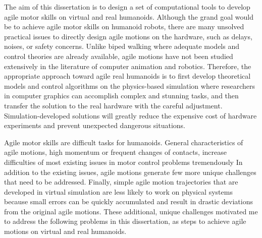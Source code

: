 The aim of this dissertation is to design a set of computational tools to
develop agile motor skills on virtual and real humanoids.
Although the grand goal would be to achieve agile motor skills on humanoid
robots,  there are many unsolved practical issues to directly
design agile 
motions on the hardware, such as delays, noises, or safety concerns.
Unlike biped walking where adequate models and control theories are
already available, agile motions have not been studied extensively in the
literature of computer animation and robotics.
Therefore, the appropriate approach toward agile real humanoids is to first
develop theoretical models and control algorithms on the physics-based
simulation where researchers in computer graphics can accomplish complex and
stunning tasks, and then transfer the solution to the real hardware
with the careful adjustment.
Simulation-developed solutions will
greatly reduce the expensive cost of hardware experiments and prevent
unexpected dangerous situations.

Agile motor skills are difficult tasks for humanoids.
General characteristics of agile motions, high momentum or frequent changes
of contacts, increase difficulties of most existing issues in motor control
problems tremendously
In addition to the existing issues, agile motions generate few more unique
challenges that need to be addressed. 
Finally, simple agile motion trajectories that are developed in virtual
simulation are less likely to work on physical systems
because small errors can be quickly accumulated and result in drastic deviations
from the original agile motions.
These additional, unique challenges motivated me to address the following 
problems in this dissertation, as steps to achieve agile motions 
on virtual and real humanoids.

